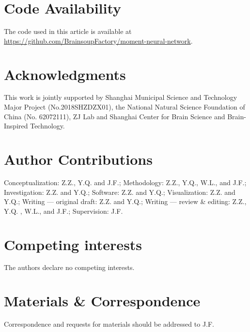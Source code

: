 \documentclass[11pt, letterpaper]{article}
\begin{document}
\section*{Code Availability}
The code used in this article is available at \href{https://github.com/BrainsoupFactory/moment-neural-network}{https://github.com/BrainsoupFactory/moment-neural-network}.

\section*{Acknowledgments}
This work is jointly supported by Shanghai Municipal Science and Technology Major Project (No.2018SHZDZX01), the National Natural Science Foundation of China (No. 62072111), ZJ Lab and Shanghai Center for Brain Science and Brain-Inspired Technology.

\section*{Author Contributions}
Conceptualization: Z.Z., Y.Q. and J.F.; 
Methodology: Z.Z., Y.Q., W.L., and J.F.;
Investigation: Z.Z. and Y.Q.;
Software: Z.Z. and Y.Q.;
Visualization: Z.Z. and Y.Q.;
Writing — original draft: Z.Z. and Y.Q.;
Writing — review \& editing: Z.Z., Y.Q. , W.L., and J.F.;
Supervision: J.F.

\section*{Competing interests}
The authors declare no competing interests.

\section*{Materials \& Correspondence}
Correspondence and requests for materials should be addressed to J.F.
\newpage



\end{document}
